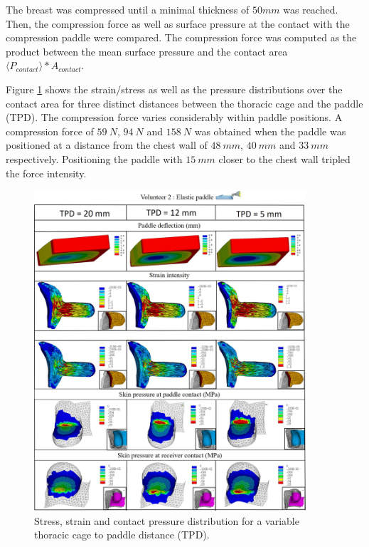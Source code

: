  The breast was compressed until a minimal thickness of $50mm$ was reached. Then, the compression force as well as surface pressure at the contact with the compression paddle were compared. The compression force was computed as the product between the mean surface pressure and the contact area $\langle P_{contact}\rangle \ast  A_{contact}$.

Figure \ref{fig:elasticpaddle} shows the strain/stress as well as the pressure distributions over the contact area for three distinct distances between the thoracic cage and the paddle (TPD). The compression force varies considerably within paddle positions. A compression force of $59\ N$, $94\ N$ and $158\ N$ was obtained when the paddle was positioned at a distance from the chest wall of $48\  mm$, $40\  mm$ and $33\ mm$ respectively. Positioning the paddle with $15\ mm$ closer to the chest wall tripled the force intensity. 
 
\begin{figure}[!h]
\centering
\includegraphics[width=0.9\textwidth,keepaspectratio]{figures/elasticpaddleresults.jpg} 
\caption{Stress, strain and contact pressure distribution for a variable thoracic cage to paddle distance (TPD).}\label{fig:elasticpaddle}
\end{figure}


